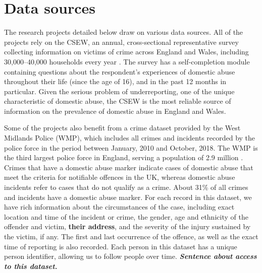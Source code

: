 \documentclass[11pt, a4paper]{article}
\begin{document}


\section{Data sources}

The research projects detailed below draw on various data sources. All of the projects rely on the CSEW, an annual, cross-sectional representative survey collecting information on victims of crime across England and Wales, including 30,000--40,000 households every year \cite{OfficeforNationalStatistics2019}. The survey has a self-completion module containing questions about the respondent's experiences of domestic abuse throughout their life (since the age of 16), and in the past 12 months in particular. Given the serious problem of underreporting, one of the unique characteristic of domestic abuse, the CSEW is the most reliable source of information on the prevalence of domestic abuse in England and Wales. 

Some of the projects also benefit from a crime dataset provided by the West Midlands Police (WMP), which includes all crimes and incidents recorded by the police force in the period between January, 2010 and October, 2018. The WMP is the third largest police force in England, serving a population of 2.9 million \cite{Homeoffice}. Crimes that have a domestic abuse marker indicate cases of domestic abuse that meet the criteria for notifiable offences in the UK, whereas domestic abuse incidents refer to cases that do not qualify as a crime. About 31\% of all crimes and incidents have a domestic abuse marker. For each record in this dataset, we have rich information about the circumstances of the case, including exact location and time of the incident or crime, the gender, age and ethnicity of the offender and victim, \textbf{their address}, and the severity of the injury sustained by the victim, if any. The first and last occurrence of the offence, as well as the exact time of reporting is also recorded. Each person in this dataset has a unique person identifier, allowing us to follow people over time. \textbf{\emph{\textit{Sentence about access to this dataset.}}}
\end{document}
